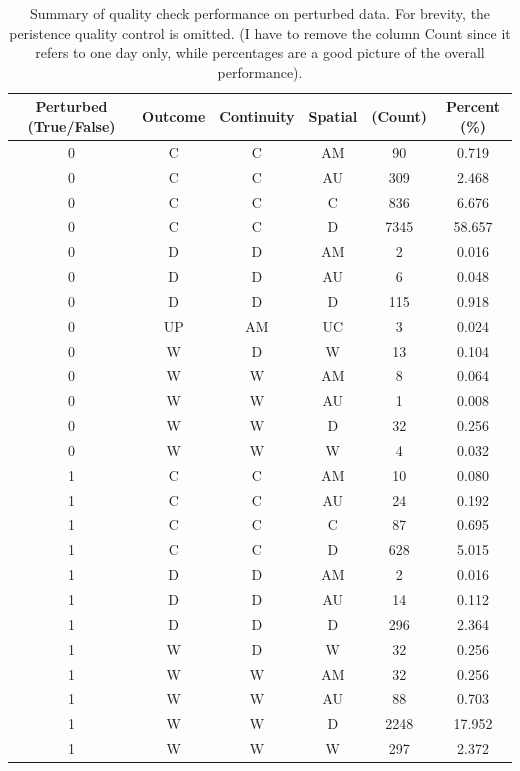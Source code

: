 \documentclass[authoryear,preprint,review,12pt]{elsarticle}
\begin{document}
\begin{table}[]
\centering
\begin{scriptsize}
    \begin{tabular}{cccccc}
        \toprule
        Perturbed (True/False) & Outcome & Continuity & Spatial & (Count) & Percent (\%) \\
        \midrule
        0 & C  & C  & AM & 90   & 0.719  \\
        0 & C  & C  & AU & 309  & 2.468  \\
        0 & C  & C  & C  & 836  & 6.676  \\
        0 & C  & C  & D  & 7345 & 58.657 \\
        0 & D  & D  & AM & 2    & 0.016  \\
        0 & D  & D  & AU & 6    & 0.048  \\
        0 & D  & D  & D  & 115  & 0.918  \\
        0 & UP & AM & UC & 3    & 0.024  \\
        0 & W  & D  & W  & 13   & 0.104  \\
        0 & W  & W  & AM & 8    & 0.064  \\
        0 & W  & W  & AU & 1    & 0.008  \\
        0 & W  & W  & D  & 32   & 0.256  \\
        0 & W  & W  & W  & 4    & 0.032  \\
        1 & C  & C  & AM & 10   & 0.080  \\
        1 & C  & C  & AU & 24   & 0.192  \\
        1 & C  & C  & C  & 87   & 0.695  \\
        1 & C  & C  & D  & 628  & 5.015  \\
        1 & D  & D  & AM & 2    & 0.016  \\
        1 & D  & D  & AU & 14   & 0.112  \\
        1 & D  & D  & D  & 296  & 2.364  \\
        1 & W  & D  & W  & 32   & 0.256  \\
        1 & W  & W  & AM & 32   & 0.256  \\
        1 & W  & W  & AU & 88   & 0.703  \\
        1 & W  & W  & D  & 2248 & 17.952 \\
        1 & W  & W  & W  & 297  & 2.372  \\
        \bottomrule
    \end{tabular}
\end{scriptsize}
\caption{Summary of quality check performance on perturbed data. For brevity, the peristence quality control is omitted. (I have to remove the column Count since it refers to one day only, while percentages are a good picture of the overall performance).}
\label{tab:validation_outcomes}
\end{table}
\end{document}
